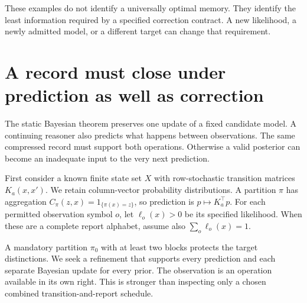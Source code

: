 These examples do not identify a universally optimal memory. They identify the least information required by a specified correction contract. A new likelihood, a newly admitted model, or a different target can change that requirement.


\section{A record must close under prediction as well as correction}
The static Bayesian theorem preserves one update of a fixed candidate model. A continuing reasoner also predicts what happens between observations. The same compressed record must support both operations. Otherwise a valid posterior can become an inadequate input to the very next prediction.

First consider a known finite state set $X$ with row-stochastic transition matrices $K_a(x,x')$. We retain column-vector probability distributions. A partition $\pi$ has aggregation $C_\pi(z,x)=1_{\{\pi(x)=z\}}$, so prediction is $p\mapsto K_a^\top p$. For each permitted observation symbol $o$, let $\ell_o(x)>0$ be its specified likelihood. When these are a complete report alphabet, assume also $\sum_o\ell_o(x)=1$.

A mandatory partition $\pi_0$ with at least two blocks protects the target distinctions. We seek a refinement that supports every prediction and each separate Bayesian update for every prior. The observation is an operation available in its own right. This is stronger than inspecting only a chosen combined transition-and-report schedule.

